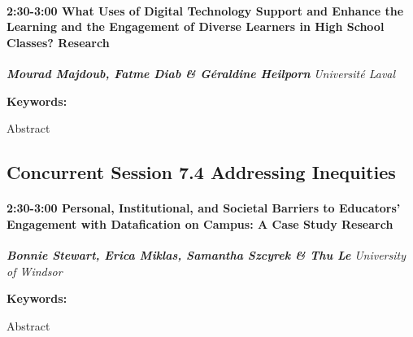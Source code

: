 \documentclass[
]{book}
\begin{document}
\begin{session}
\hypertarget{what-uses-of-digital-technology-support-and-enhance-the-learning-and-the-engagement-of-diverse-learners-in-high-school-classes-research}{%
\paragraph*{\texorpdfstring{2:30-3:00 \textbar{} \textbf{What Uses of
Digital Technology Support and Enhance the Learning and the Engagement
of Diverse Learners in High School Classes?} \textbar{}
Research}{2:30-3:00 \textbar{} What Uses of Digital Technology Support and Enhance the Learning and the Engagement of Diverse Learners in High School Classes? \textbar{} Research}}\label{what-uses-of-digital-technology-support-and-enhance-the-learning-and-the-engagement-of-diverse-learners-in-high-school-classes-research}}

\textbf{\emph{Mourad Majdoub, Fatme Diab \& Géraldine Heilporn}}
\textbar{} \emph{Université Laval}

\textbf{Keywords:}

Abstract
\end{session}

\hypertarget{concurrent-session-7.4-addressing-inequities}{%
\subsection*{Concurrent Session 7.4 \textbar{} Addressing Inequities}\label{concurrent-session-7.4-addressing-inequities}}

\begin{session}
\hypertarget{personal-institutional-and-societal-barriers-to-educators-engagement-with-datafication-on-campus-a-case-study-research}{%
\paragraph*{\texorpdfstring{2:30-3:00 \textbar{} \textbf{Personal,
Institutional, and Societal Barriers to Educators' Engagement with
Datafication on Campus: A Case Study} \textbar{}
Research}{2:30-3:00 \textbar{} Personal, Institutional, and Societal Barriers to Educators' Engagement with Datafication on Campus: A Case Study \textbar{} Research}}\label{personal-institutional-and-societal-barriers-to-educators-engagement-with-datafication-on-campus-a-case-study-research}}

\textbf{\emph{Bonnie Stewart, Erica Miklas, Samantha Szcyrek \& Thu Le}}
\textbar{} \emph{University of Windsor}

\textbf{Keywords:}

Abstract
\end{session}
\end{document}

